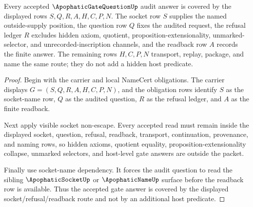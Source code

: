 \begin{theorem}
\label{thm:apophatic-gate-question-socket-refusal-coverage}
Every accepted $\ApophaticGateQuestionUp$ audit answer is covered by the
displayed rows $S,Q,R,A,H,C,P,N$. The socket row $S$ supplies the named
outside-supply position, the question row $Q$ fixes the audited request, the
refusal ledger $R$ excludes hidden axiom, quotient, proposition-extensionality,
unmarked-selector, and unrecorded-inscription channels, and the readback row
$A$ records the finite answer. The remaining rows $H,C,P,N$ transport, replay,
package, and name the same route; they do not add a hidden host predicate.
\end{theorem}
\begin{proof}
Begin with the carrier and local NameCert obligations. The carrier displays
$G=(S,Q,R,A,H,C,P,N)$, and the obligation rows identify $S$ as the socket-name
row, $Q$ as the audited question, $R$ as the refusal ledger, and $A$ as the
finite readback.

Next apply visible socket non-escape. Every accepted read must remain inside
the displayed socket, question, refusal, readback, transport, continuation,
provenance, and naming rows, so hidden axioms, quotient equality,
proposition-extensionality collapse, unmarked selectors, and host-level gate
answers are outside the packet.

Finally use socket-name dependency. It forces the audit question to read the
sibling $\ApophaticSocketUp$ or $\ApophaticNameUp$ surface before the readback
row is available. Thus the accepted gate answer is covered by the displayed
socket/refusal/readback route and not by an additional host predicate.
\end{proof}


